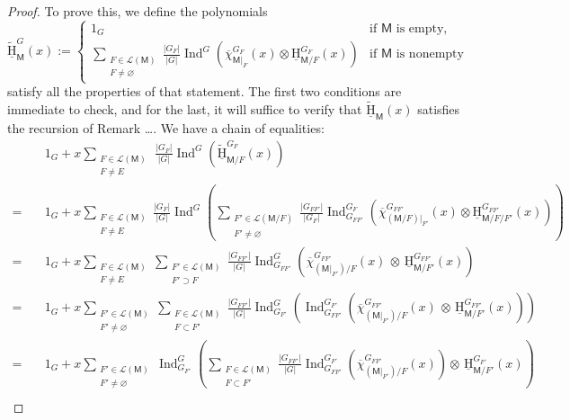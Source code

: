 \documentclass[11pt, a4paper, english]{amsart}
\theoremstyle{teoremas}
\theoremstyle{definition}
\newcommand{\M}{\mathsf{M}}
\newcommand{\uH}{\underline{\mathrm{H}}}
\newcommand{\Ind}{\operatorname{Ind}}
\begin{document}
\begin{proof}
    To prove this, we define the polynomials
    \[ \widetilde{\uH}_{\M}^G(x) := 
    \begin{cases} 1_G & \text{if $\M$ is empty,}\\ \displaystyle\sum_{\substack{F\in\mathcal{L}(\M)\\ F\neq\varnothing}} \frac{|G_F|}{|G|}\Ind^G\left(\overline{\chi}_{\M|_F}^{G_F}(x)\otimes \uH_{\M/F}^{G_F}(x)\right) & \text{if $\M$ is nonempty}
    \end{cases}\]
    satisfy all the properties of that statement. The first two conditions are immediate to check, and for the last, it will suffice to verify that $\widetilde{\uH}_{\M}(x)$ satisfies the recursion of Remark \dots. We have a chain of equalities:
    \begin{align}
        &1_G + x\sum_{\substack{F\in\mathcal{L}(\M)\\ F\neq E}}\,\frac{|G_{F}|}{|G|}\Ind^G\left(\widetilde{\uH}_{\M/F}^{G_F}(x)\right)\nonumber\\ 
        =\quad &1_G + x\sum_{\substack{F\in \mathcal{L}(\M)\\F\neq E}}\frac{|G_{F}|}{|G|}\Ind^G\left(\sum_{\substack{F'\in \mathcal{L}(\M/F)\\F'\neq \varnothing}}\frac{|G_{FF'}|}{|G_F|}\Ind_{G_{FF'}}^{G_F}\left(\overline{\chi}_{(\M/F)|_{F'}}^{G_{FF'}}(x)\otimes \uH_{\M/F/F'}^{G_{FF'}}(x)\right)\right) \nonumber\\
        =\quad &1_G + x\sum_{\substack{F\in \mathcal{L}(\M)\\F\neq E}} \sum_{\substack{F'\in \mathcal{L}(\M)\\F'\supset F}} \frac{|G_{FF'}|}{|G|}\Ind_{G_{FF'}}^G\left(\overline{\chi}_{(\M|_{F'})/F}^{G_{FF'}}(x)\,\otimes\, \uH_{\M/F'}^{G_{FF'}}(x)\right)\nonumber\\
        =\quad &1_G + x\sum_{\substack{F'\in \mathcal{L}(\M)\\F'\neq \varnothing}} \sum_{\substack{F\in \mathcal{L}(\M)\\F\subset F'}} \frac{|G_{FF'}|}{|G|}\Ind_{G_{F'}}^G\left(\Ind_{G_{FF'}}^{G_{F'}}\left(\overline{\chi}_{(\M|_{F'})/F}^{G_{FF'}}(x)\,\otimes\, \uH_{\M/F'}^{G_{FF'}}(x)\right)\right)\nonumber\\
        =\quad &1_G + x\sum_{\substack{F'\in \mathcal{L}(\M)\\F'\neq \varnothing}} \Ind_{G_{F'}}^G\left( \sum_{\substack{F\in \mathcal{L}(\M)\\F\subset F'}} \frac{|G_{FF'}|}{|G|}\Ind_{G_{FF'}}^{G_{F'}}\left(\overline{\chi}_{(\M|_{F'})/F}^{G_{FF'}}(x)\right)\otimes\, \uH_{\M/F'}^{G_{F'}}(x)\right)\nonumber\\

\end{align}
\end{proof}
\end{document}
